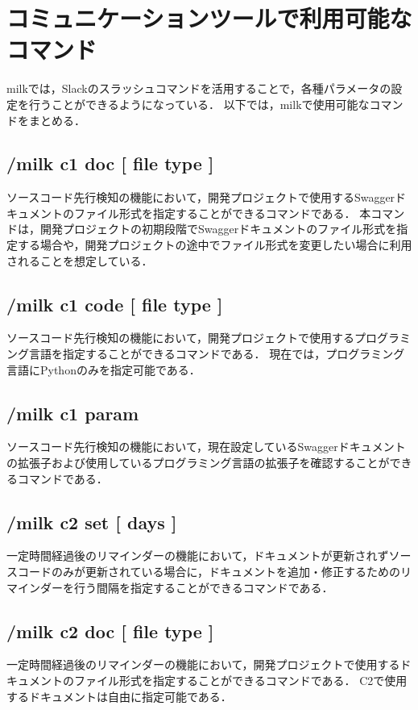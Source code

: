 \section{コミュニケーションツールで利用可能なコマンド}
milkでは，Slackのスラッシュコマンドを活用することで，各種パラメータの設定を行うことができるようになっている．
以下では，milkで使用可能なコマンドをまとめる．

\subsection*{/milk c1 doc [ file type ]}
ソースコード先行検知の機能において，開発プロジェクトで使用するSwaggerドキュメントのファイル形式を指定することができるコマンドである．
本コマンドは，開発プロジェクトの初期段階でSwaggerドキュメントのファイル形式を指定する場合や，開発プロジェクトの途中でファイル形式を変更したい場合に利用されることを想定している．

\subsection*{/milk c1 code [ file type ]}
ソースコード先行検知の機能において，開発プロジェクトで使用するプログラミング言語を指定することができるコマンドである．
現在では，プログラミング言語にPythonのみを指定可能である．

\subsection*{/milk c1 param}
ソースコード先行検知の機能において，現在設定しているSwaggerドキュメントの拡張子および使用しているプログラミング言語の拡張子を確認することができるコマンドである．

\subsection*{/milk c2 set [ days ]}
一定時間経過後のリマインダーの機能において，ドキュメントが更新されずソースコードのみが更新されている場合に，ドキュメントを追加・修正するためのリマインダーを行う間隔を指定することができるコマンドである．

\subsection*{/milk c2 doc [ file type ]}
一定時間経過後のリマインダーの機能において，開発プロジェクトで使用するドキュメントのファイル形式を指定することができるコマンドである．
C2で使用するドキュメントは自由に指定可能である．

